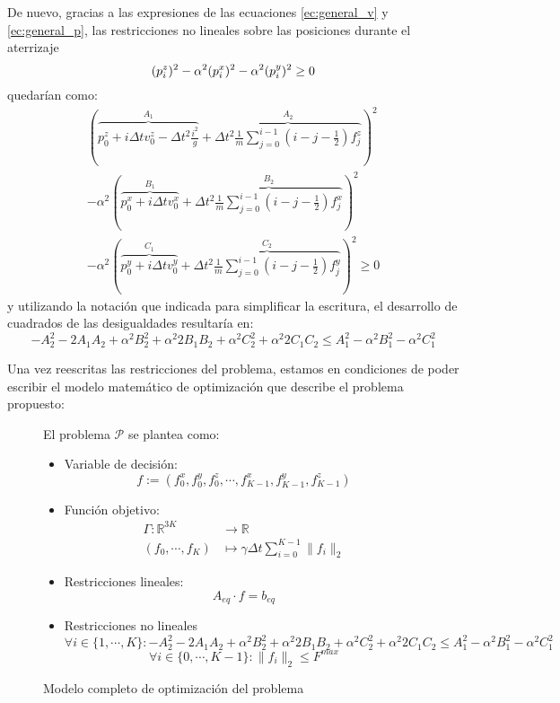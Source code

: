 \documentclass[10pt,a4paper]{article}
\begin{document}
De nuevo, gracias a las expresiones de las ecuaciones \ref{ec:general_v} y \ref{ec:general_p}, las restricciones no lineales sobre las posiciones durante el aterrizaje
\[
(p_i^z)^2 - \alpha^2 (p_i^x)^2 - \alpha^2 (p_i^y)^2 \geq 0 \\
\]
quedarían como:
\begin{align*}
\left(\overbrace{p_0^z + i \Delta t v_0^z - \Delta t^2 \frac{i^2}{g}}^{A_1} + \overbrace{\Delta t^2 \frac{1}{m} \sum_{j=0}^{i-1} \left(i-j-\frac{1}{2}\right) f_j^z}^{A_2}\right)^2 \\
-\alpha^2 \left(\overbrace{p_0^x + i \Delta t v_0^x}^{B_1} + \overbrace{\Delta t^2 \frac{1}{m} \sum_{j=0}^{i-1} \left(i-j-\frac{1}{2}\right) f_j^x}^{B_2}\right)^2 \\
- \alpha^2 \left(\overbrace{p_0^y + i \Delta t v_0^y}^{C_1} + \overbrace{\Delta t^2 \frac{1}{m} \sum_{j=0}^{i-1} \left(i-j-\frac{1}{2}\right) f_j^y}^{C_2}\right)^2 \geq 0
\end{align*}
y utilizando la notación que indicada para simplificar la escritura, el desarrollo de cuadrados de las desigualdades resultaría en:
\[
-A_2^2-2A_1A_2 + \alpha^2 B_2^2 + \alpha^2 2B_1B_2 + \alpha^2 C_2^2 + \alpha^2 2C_1C_2 \leq A_1^2 - \alpha^2 B_1^2 - \alpha^2 C_1^2
\]

Una vez reescritas las restricciones del problema, estamos en condiciones de poder escribir el modelo matemático de optimización que describe el problema propuesto:

\begin{figure}[h]
El problema $\mathcal{P}$ se plantea como:
\begin{itemize}
\item Variable de decisión:
\[
f := (f_0^x, f_0^y, f_0^z, \cdots, f_{K-1}^x, f_{K-1}^y, f_{K-1}^z)
\]
\item Función objetivo:
\begin{align*}
\Gamma: \mathbb R^{3K} &\longrightarrow \mathbb R \\
		(f_0, \cdots, f_K) &\longmapsto \gamma \Delta t \sum_{i=0}^{K-1} \parallel f_i \parallel_2
\end{align*}
\item Restricciones lineales:
\[
A_{eq} \cdot f = b_{eq}
\]
\item Restricciones no lineales
\[
\forall i \in \{1, \cdots, K\} : -A_2^2-2A_1A_2 + \alpha^2 B_2^2 + \alpha^2 2B_1B_2 + \alpha^2 C_2^2 + \alpha^2 2C_1C_2 \leq A_1^2 - \alpha^2 B_1^2 - \alpha^2 C_1^2 
\]
\[
\forall i \in \{0, \cdots, K-1\} : \parallel f_i \parallel_2 \leq F^{max}
\]
\end{itemize}
\caption{Modelo completo de optimización del problema}
\end{figure}
\end{document}
